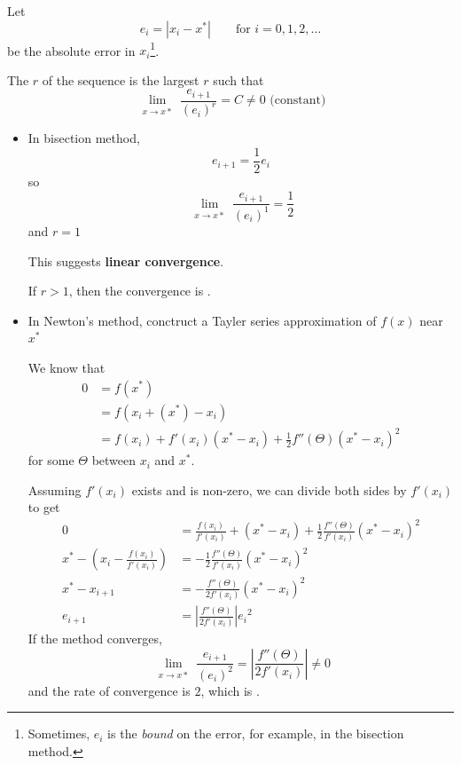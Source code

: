 Let \[
    e_i = | x_i - x^\ast | \qquad \text{for } i = 0, 1, 2, \dots
\] be the absolute error in \( x_i \)\footnote{Sometimes, \( e_i \) is the \textit{bound} on the error, for example, in the bisection method.}.

The  \( r \) of the sequence is the largest \( r \) such that \[
    \lim_{\substack{x \to x\ast}} \frac{e_{i+1}}{(e_i)^r} = C \neq 0 \text{ (constant)}
\]

\begin{itemize}
    \item In bisection method, \[
              e_{i+1} = \frac{1}{2} e_i
          \] so \[
              \lim_{\substack{x \to x\ast}} \frac{e_{i+1}}{(e_i)^1} = \frac{1}{2}
          \] and \( r = 1 \)

          This suggests \textbf{linear convergence}.

          \begin{note}
              If \( r > 1 \), then the convergence is .
          \end{note}

    \item In Newton's method, conctruct a Tayler series approximation of \( f(x) \) near \( x^\ast \)

          We know that \begin{align*}
              0 & = f(x^\ast)
              \\
                & = f(x_i + (x^\ast) - x_i)
              \\
                & = f(x_i) + f'(x_i) (x^\ast - x_i) + \frac{1}{2} f''(\Theta) (x^\ast - x_i)^2
          \end{align*}
          for some \( \Theta \) between \( x_i \) and \( x^\ast \).

          Assuming \( f'(x_i) \) exists and is non-zero, we can divide both sides by \( f'(x_i) \) to get \begin{align*}
              0
               & = \frac{f(x_i)}{f'(x_i)} + (x^\ast - x_i) + \frac{1}{2} \frac{f''(\Theta)}{f'(x_i)} (x^\ast - x_i)^2
              \\
              x^\ast - \left( x_i - \frac{f(x_i)}{f'(x_i)} \right)
               & = -\frac{1}{2} \frac{f''(\Theta)}{f'(x_i)} (x^\ast - x_i)^2
              \\
              x^\ast - x_{i+1}
               & = - \frac{f''(\Theta)}{2f'(x_i)} (x^\ast - x_i)^2
              \\
              e_{i+1}
               & = \left| \frac{f''(\Theta)}{2f'(x_i)} \right| {e_i}^2
          \end{align*}
          If the method converges, \[
              \lim_{\substack{x \to x\ast}} \frac{e_{i+1}}{(e_i)^2} = \left| \frac{f''(\Theta)}{2f'(x_i)} \right| \neq 0
          \] and the rate of convergence is \( 2 \), which is .


\end{itemize}
